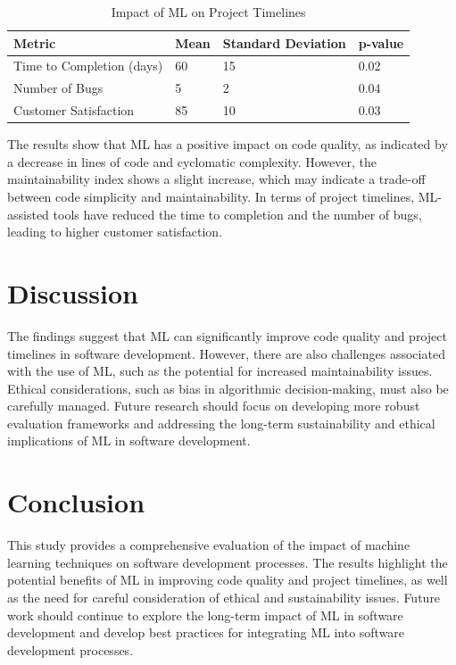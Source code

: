 \documentclass{article}
\begin{document}
\begin{table}[ht]
    \centering
    \caption{Impact of ML on Project Timelines}
    \label{tab:project_timelines}
    \begin{tabular}{@{}llll@{}}
        \toprule
        \textbf{Metric} & \textbf{Mean} & \textbf{Standard Deviation} & \textbf{p-value} \\
        \midrule
        Time to Completion (days) & 60 & 15 & 0.02 \\
        Number of Bugs & 5 & 2 & 0.04 \\
        Customer Satisfaction & 85 & 10 & 0.03 \\
        \bottomrule
    \end{tabular}
\end{table}

The results show that ML has a positive impact on code quality, as indicated by a decrease in lines of code and cyclomatic complexity. However, the maintainability index shows a slight increase, which may indicate a trade-off between code simplicity and maintainability. In terms of project timelines, ML-assisted tools have reduced the time to completion and the number of bugs, leading to higher customer satisfaction.

\section{Discussion}
The findings suggest that ML can significantly improve code quality and project timelines in software development. However, there are also challenges associated with the use of ML, such as the potential for increased maintainability issues. Ethical considerations, such as bias in algorithmic decision-making, must also be carefully managed. Future research should focus on developing more robust evaluation frameworks and addressing the long-term sustainability and ethical implications of ML in software development.

\section{Conclusion}
This study provides a comprehensive evaluation of the impact of machine learning techniques on software development processes. The results highlight the potential benefits of ML in improving code quality and project timelines, as well as the need for careful consideration of ethical and sustainability issues. Future work should continue to explore the long-term impact of ML in software development and develop best practices for integrating ML into software development processes.
\end{document}
